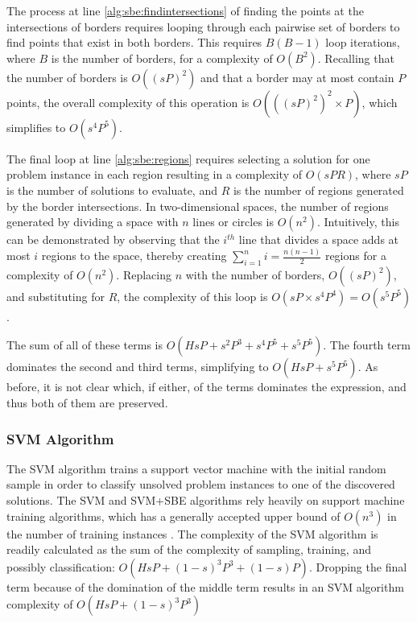 The process at line \ref{alg:sbe:findintersections} of finding the points at the intersections of borders requires looping through each pairwise set of borders to find points that exist in both borders.  This requires $B(B-1)$ loop iterations, where $B$ is the number of borders, for a complexity of $O(B^2)$.  Recalling that the number of borders is $O((sP)^2)$ and that a border may at most contain $P$ points, the overall complexity of this operation is $O(((sP)^2)^2 \times P)$, which simplifies to $O(s^4P^5)$.

The final loop at line \ref{alg:sbe:regions} requires selecting a solution for  one problem instance in each region resulting in a complexity of $O(sPR)$, where $sP$ is the number of solutions to evaluate, and $R$ is the number of regions generated by the border intersections.  In two-dimensional spaces, the number of regions generated by dividing a space with $n$ lines or circles is $O(n^2)$.  Intuitively, this can be demonstrated by observing that the $i^{th}$ line that divides a space adds at most $i$ regions to the space, thereby creating $\sum\nolimits_{i=1}^{n}i = \frac{n(n-1)}{2}$ regions for a complexity of $O(n^2)$.  Replacing $n$ with the number of borders, $O((sP)^2)$, and substituting for $R$, the complexity of this loop is $O(sP \times s^4P^4) = O(s^5P^5)$.

The sum of all of these terms is $O(HsP + s^2P^3 + s^4P^5 + s^5P^5)$.  The fourth term dominates the second and third terms, simplifying to  $O(HsP + s^5P^5)$.  As before, it is not clear which, if either, of the terms dominates the expression, and thus both of them are preserved.

\subsubsection{SVM Algorithm} The SVM algorithm trains a support vector machine with the initial random sample in order to classify unsolved problem instances to one of the discovered solutions.  The SVM and SVM+SBE algorithms rely heavily on support machine training algorithms, which has a generally accepted upper bound of $O(n^3)$ in the number of training instances \citep{bottou2007support,List09svm-optimization}.  The complexity of the SVM algorithm is readily calculated as the sum of the complexity of sampling, training, and possibly classification: $O(HsP + (1-s)^3P^3 + (1-s)P)$.  Dropping the final term because of the domination of the middle term results in an SVM algorithm complexity of $O(HsP + (1-s)^3P^3)$

